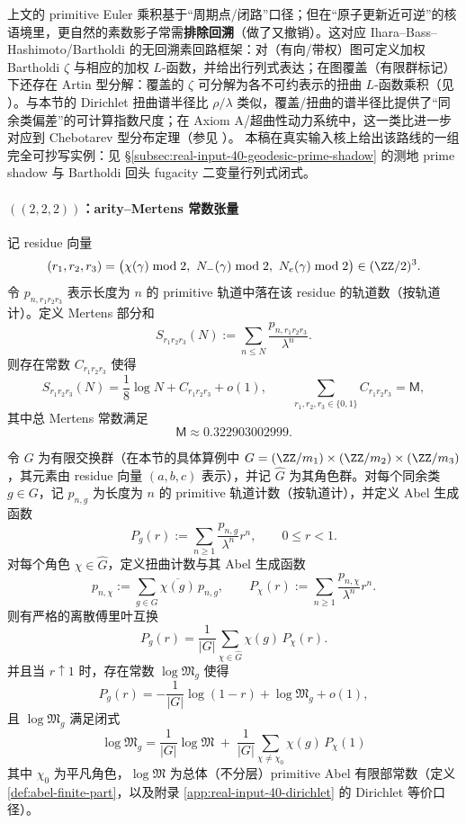 \begin{remark}\label{rem:rotation-polytope-bartholdi}
上文的 primitive Euler 乘积基于“周期点/闭路”口径；但在“原子更新近可逆”的核语境里，更自然的素数影子常需\textbf{排除回溯}（做了又撤销）。这对应 Ihara--Bass--Hashimoto/Bartholdi 的无回溯素回路框架：对（有向/带权）图可定义加权 Bartholdi $\zeta$ 与相应的加权 $L$-函数，并给出行列式表达；在图覆盖（有限群标记）下还存在 Artin 型分解：覆盖的 $\zeta$ 可分解为各不可约表示的扭曲 $L$-函数乘积（见 \cite{ChoeKwakParkSato2007Bartholdi,Sato2008WeightedBartholdiCoverings}）。与本节的 Dirichlet 扭曲谱半径比 $\rho/\lambda$ 类似，覆盖/扭曲的谱半径比提供了“同余类偏差”的可计算指数尺度；在 Axiom A/超曲性动力系统中，这一类比进一步对应到 Chebotarev 型分布定理（参见 \cite{PollicottSharp2007Chebotarev}）。
本稿在真实输入核上给出该路线的一组完全可抄写实例：见 \S\ref{subsec:real-input-40-geodesic-prime-shadow} 的测地 prime shadow 与 Bartholdi 回头 fugacity 二变量行列式闭式。
\end{remark}

\paragraph{\texorpdfstring{$((2,2,2))$}{(2,2,2)}：arity--Mertens 常数张量}
记 residue 向量
$$
(r_1,r_2,r_3)=\bigl(\chi(\gamma)\bmod 2,\ N_-(\gamma)\bmod 2,\ N_e(\gamma)\bmod 2\bigr)\in(\ZZ/2)^3.
$$
令 $p_{n,r_1r_2r_3}$ 表示长度为 $n$ 的 primitive 轨道中落在该 residue 的轨道数（按轨道计）。定义 Mertens 部分和
$$
S_{r_1r_2r_3}(N):=\sum_{n\le N}\frac{p_{n,r_1r_2r_3}}{\lambda^n}.
$$
则存在常数 $C_{r_1r_2r_3}$ 使得
$$
S_{r_1r_2r_3}(N)=\frac{1}{8}\log N + C_{r_1r_2r_3}+o(1),
\qquad
\sum_{r_1,r_2,r_3\in\{0,1\}}C_{r_1r_2r_3}=\mathsf{M},
$$
其中总 Mertens 常数满足
$$
\mathsf{M}\approx 0.322903002999.
$$

\begin{remark}\label{prop:arity-chebotarev-mertens-fourier}
令 $G$ 为有限交换群（在本节的具体算例中 $G=(\ZZ/m_1)\times(\ZZ/m_2)\times(\ZZ/m_3)$，其元素由 residue 向量 $(a,b,c)$ 表示），并记 $\widehat G$ 为其角色群。对每个同余类 $g\in G$，记 $p_{n,g}$ 为长度为 $n$ 的 primitive 轨道计数（按轨道计），并定义 Abel 生成函数
$$
P_g(r):=\sum_{n\ge 1}\frac{p_{n,g}}{\lambda^n}r^n,\qquad 0\le r<1.
$$
对每个角色 $\chi\in\widehat G$，定义扭曲计数与其 Abel 生成函数
$$
p_{n,\chi}:=\sum_{g\in G}\overline{\chi(g)}\,p_{n,g},
\qquad
P_\chi(r):=\sum_{n\ge 1}\frac{p_{n,\chi}}{\lambda^n}r^n.
$$
则有严格的离散傅里叶互换
$$
P_g(r)=\frac{1}{|G|}\sum_{\chi\in\widehat G}\chi(g)\,P_\chi(r).
$$
并且当 $r\uparrow 1$ 时，存在常数 $\log\mathfrak{M}_g$ 使得
$$
P_g(r)=-\frac{1}{|G|}\log(1-r)+\log\mathfrak{M}_g+o(1),
$$
且 $\log\mathfrak{M}_g$ 满足闭式
$$
\boxed{\ 
\log\mathfrak{M}_g
=\frac{1}{|G|}\log\mathfrak{M}
\;+\;\frac{1}{|G|}\sum_{\chi\neq \chi_0}\chi(g)\,P_\chi(1)\ 
}
$$
其中 $\chi_0$ 为平凡角色，$\log\mathfrak{M}$ 为总体（不分层）primitive Abel 有限部常数（定义 \ref{def:abel-finite-part}，以及附录 \ref{app:real-input-40-dirichlet} 的 Dirichlet 等价口径）。
\end{remark}

